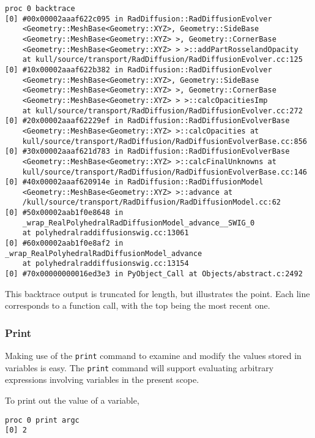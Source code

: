 \documentclass{refart}
\begin{document}
\begin{Verbatim}
proc 0 backtrace
[0] #00x00002aaaf622c095 in RadDiffusion::RadDiffusionEvolver
    <Geometry::MeshBase<Geometry::XYZ>, Geometry::SideBase
    <Geometry::MeshBase<Geometry::XYZ> >, Geometry::CornerBase
    <Geometry::MeshBase<Geometry::XYZ> > >::addPartRosselandOpacity
    at kull/source/transport/RadDiffusion/RadDiffusionEvolver.cc:125
[0] #10x00002aaaf622b382 in RadDiffusion::RadDiffusionEvolver
    <Geometry::MeshBase<Geometry::XYZ>, Geometry::SideBase
    <Geometry::MeshBase<Geometry::XYZ> >, Geometry::CornerBase
    <Geometry::MeshBase<Geometry::XYZ> > >::calcOpacitiesImp
    at kull/source/transport/RadDiffusion/RadDiffusionEvolver.cc:272
[0] #20x00002aaaf62229ef in RadDiffusion::RadDiffusionEvolverBase
    <Geometry::MeshBase<Geometry::XYZ> >::calcOpacities at
    kull/source/transport/RadDiffusion/RadDiffusionEvolverBase.cc:856
[0] #30x00002aaaf621d783 in RadDiffusion::RadDiffusionEvolverBase
    <Geometry::MeshBase<Geometry::XYZ> >::calcFinalUnknowns at
    kull/source/transport/RadDiffusion/RadDiffusionEvolverBase.cc:146
[0] #40x00002aaaf620914e in RadDiffusion::RadDiffusionModel
    <Geometry::MeshBase<Geometry::XYZ> >::advance at
    /kull/source/transport/RadDiffusion/RadDiffusionModel.cc:62
[0] #50x00002aab1f0e8648 in
    _wrap_RealPolyhedralRadDiffusionModel_advance__SWIG_0
    at polyhedralraddiffusionswig.cc:13061
[0] #60x00002aab1f0e8af2 in _wrap_RealPolyhedralRadDiffusionModel_advance
    at polyhedralraddiffusionswig.cc:13154
[0] #70x00000000016ed3e3 in PyObject_Call at Objects/abstract.c:2492
\end{Verbatim}

This backtrace output is truncated for length, but illustrates the point. Each line corresponds to a function call, with the top being the most recent one.

\subsubsection{Print}

Making use of the \texttt{print} command to examine and modify the values stored in variables is easy. The \texttt{print} command will support evaluating arbitrary expressions involving variables in the present scope.

To print out the value of a variable,

\begin{Verbatim}
proc 0 print argc
[0] 2
\end{Verbatim}
\end{document}
